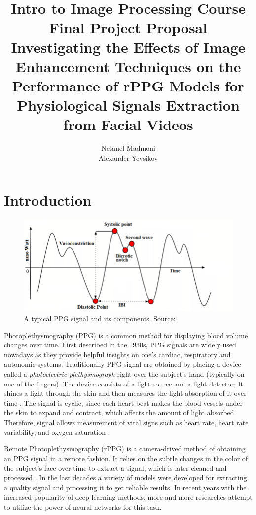 \documentclass{article}
\author{Netanel Madmoni  \\ Alexander Yevsikov }
\title{Intro to Image Processing Course Final Project Proposal \\
\large Investigating the Effects of Image Enhancement Techniques 
on the Performance of rPPG Models for
Physiological Signals Extraction from Facial Videos}
\begin{document}
\maketitle

\section*{Introduction}

\begin{figure}
	\includegraphics[scale=0.25]{figures/A-typical-PPG-signal-and-its-components.png}
	\caption{A typical PPG signal and its components. Source: \cite{nathPhotoplethysmogramBasedNonInvasive2018}}
\end{figure}

Photoplethysmography (PPG) is a common method for displaying blood volume changes over time. First described in the 1930s, PPG signals are widely used nowadays as they provide helpful insights on one's cardiac, respiratory and autonomic systems. Traditionally PPG signal are obtained by placing a device called a \textit{photoelectric plethysmograph} right over the subject's hand (typically on one of the fingers). The device consists of a light source and a light detector; It shines a light through the skin and then measures the light absorption of it over time \cite{alianPhotoplethysmography2014}. The signal is cyclic, since each heart beat makes the blood vessels under the skin to expand and contract, which affects the amount of light absorbed. Therefore, signal allows measurement of vital signs such as heart rate, heart rate variability, and oxygen saturation \cite{pirzadaRemotePhotoplethysmographyRPPG2023}.

Remote Photoplethysmography (rPPG) is a camera-drived method of obtaining an PPG signal in a remote fashion. It relies on the subtle changes in the color of the subject's face over time to extract a signal, which is later cleaned and processed \cite{pirzadaRemotePhotoplethysmographyRPPG2023}. In the last decades a variety of models were developed for extracting a quality signal and processing it to get reliable results. In recent years with the increased popularity of deep learning methods, more and more researches attempt to utilize the power of neural networks for this task.
\end{document}
